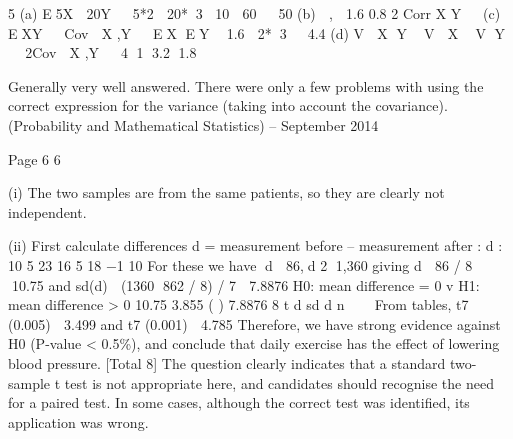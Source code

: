 \documentclass[a4paper,12pt]{article}
\begin{document}

5 (a) E5X  20Y   5*2  20*3 10  60   50
(b)  ,  1.6 0.8
2
Corr X Y  
(c) EXY   Cov  X ,Y   EX EY  1.6  2*3  4.4
(d) V  X Y  V  X  V Y   2Cov  X ,Y   4 1 3.2 1.8

Generally very well answered. There were only a few problems with using the correct
expression for the variance (taking into account the covariance).
 (Probability and Mathematical Statistics) – September 2014 

Page 6
6 \item \item (i) The two samples are from the same patients, so they are clearly not
independent. 
\item \item (ii) First calculate differences d = measurement before – measurement after :
  d : 10 5 23 16 5 18 −1 10
For these we have d  86,d 2 1,360
giving d  86 / 8 10.75 and sd(d)  (1360 862 / 8) / 7  7.8876
H0: mean difference = 0 v H1: mean difference > 0
10.75 3.855
( ) 7.8876 8
t d
sd d n
  
From tables, t7 (0.005)  3.499 and t7 (0.001)  4.785
Therefore, we have strong evidence against H0 (P-value < 0.5\%), and
conclude that daily exercise has the effect of lowering blood pressure. 
[Total 8]
The question clearly indicates that a standard two-sample t
test is not appropriate here, and candidates should recognise the need for a paired test. In
some cases, although the correct test was identified, its application was wrong.
\end{document}
